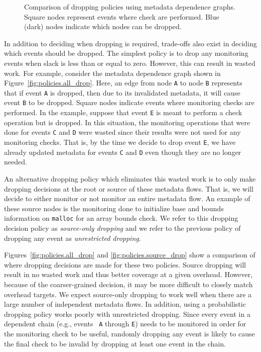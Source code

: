 \begin{figure}
\begin{center}
{    \label{fig:policies.source_drop}
  }
  \vspace{-0.1in}
  \end{center}
  \caption{Comparison of dropping policies using metadata dependence graphs.
  Square nodes represent events where check are performed. Blue (dark) nodes
  indicate which nodes can be dropped.}
  \label{fig:policies.policies}
\end{figure}

In addition to deciding when dropping is required, trade-offs also exist in
deciding which events should be dropped.
The simplest policy is to drop any monitoring events when slack is less than or equal to zero.  However, this can result in
wasted work. For example, consider the metadata dependence graph shown in
Figure~\ref{fig:policies.all_drop}. Here, an edge from node {\tt A} to node
{\tt B} represents that if event {\tt A} is dropped, then due to its
invalidated metadata, it will cause event {\tt B} to be dropped. Square
nodes indicate events where monitoring checks are performed. In the
example, suppose that event {\tt E} is meant to perform a check operation but is dropped.
In this situation, the
monitoring operations that were done for events {\tt C} and {\tt D} were wasted
since their results were not used for any monitoring checks.
That is, by the time we decide to drop event {\tt E}, we have already 
updated metadata for events {\tt C} and {\tt D} even though they are no longer needed.

An alternative dropping policy which eliminates this wasted work is to only make dropping decisions at
the root or source of these metadata flows. That is, we will decide to either monitor or
not monitor an entire metadata flow. An example of these source nodes is the
monitoring done to initialize base and bounds information on {\tt malloc} for
an array bounds check. We refer to this dropping decision policy
as \emph{source-only dropping} and we refer to the previous policy of 
dropping any event as \emph{unrestricted dropping}.

Figures~\ref{fig:policies.all_drop} and \ref{fig:policies.source_drop} show a
comparison of where dropping decisions are made for these two policies. Source
dropping will
result in no wasted work and thus better coverage at a given overhead. However, because of the coarser-grained decision, it
may be more difficult to closely match overhead targets. We expect source-only dropping 
to work well when there are a large number of independent metadata flows.
In addition, using a probabilistic dropping policy works poorly with
unrestricted dropping. Since every event in a dependent chain (e.g., events {\tt
A} through {\tt E}) needs to be monitored in order for the monitoring check to
be useful, randomly dropping any event is likely to cause the final check to be
invalid by dropping at least one event in the chain.

